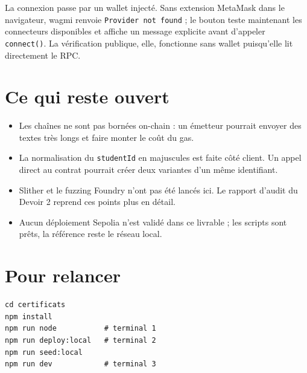 \documentclass[11pt,a4paper,parskip=half]{scrartcl}
\begin{document}
La connexion passe par un wallet injecté. Sans extension MetaMask dans le
navigateur, wagmi renvoie \texttt{Provider not found} ; le bouton teste
maintenant les connecteurs disponibles et affiche un message explicite avant
d'appeler \texttt{connect()}. La vérification publique, elle, fonctionne sans
wallet puisqu'elle lit directement le RPC.

\section{Ce qui reste ouvert}

\begin{itemize}
\item Les chaînes ne sont pas bornées on-chain : un émetteur pourrait envoyer
  des textes très longs et faire monter le coût du gas.
\item La normalisation du \texttt{studentId} en majuscules est faite côté client.
  Un appel direct au contrat pourrait créer deux variantes d'un même identifiant.
\item Slither et le fuzzing Foundry n'ont pas été lancés ici. Le rapport d'audit
  du Devoir 2 reprend ces points plus en détail.
\item Aucun déploiement Sepolia n'est validé dans ce livrable ; les scripts sont
  prêts, la référence reste le réseau local.
\end{itemize}

\section{Pour relancer}

\begin{lstlisting}[basicstyle=\ttfamily\small]
cd certificats
npm install
npm run node           # terminal 1
npm run deploy:local   # terminal 2
npm run seed:local
npm run dev            # terminal 3
\end{lstlisting}
\end{document}

